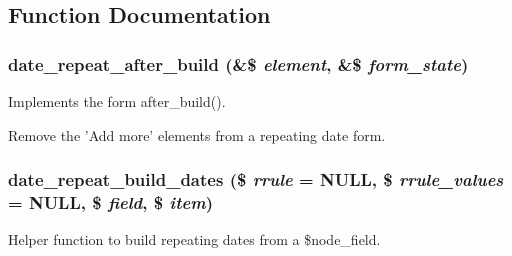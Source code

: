 \subsection{Function Documentation}
\hypertarget{date__repeat__field_8module_ab99b7df43b4a1e9f1078af6a37729437}{
\subsubsection[{date\_\-repeat\_\-after\_\-build}]{\setlength{\rightskip}{0pt plus 5cm}date\_\-repeat\_\-after\_\-build (\&\$ {\em element}, \/  \&\$ {\em form\_\-state})}}
\label{date__repeat__field_8module_ab99b7df43b4a1e9f1078af6a37729437}
Implements the form after\_\-build().

Remove the 'Add more' elements from a repeating date form. \hypertarget{date__repeat__field_8module_a749f692c4fa9c346f1760a10f3ae96ed}{
\subsubsection[{date\_\-repeat\_\-build\_\-dates}]{\setlength{\rightskip}{0pt plus 5cm}date\_\-repeat\_\-build\_\-dates (\$ {\em rrule} = {\ttfamily NULL}, \/  \$ {\em rrule\_\-values} = {\ttfamily NULL}, \/  \$ {\em field}, \/  \$ {\em item})}}
\label{date__repeat__field_8module_a749f692c4fa9c346f1760a10f3ae96ed}
Helper function to build repeating dates from a \$node\_\-field.


